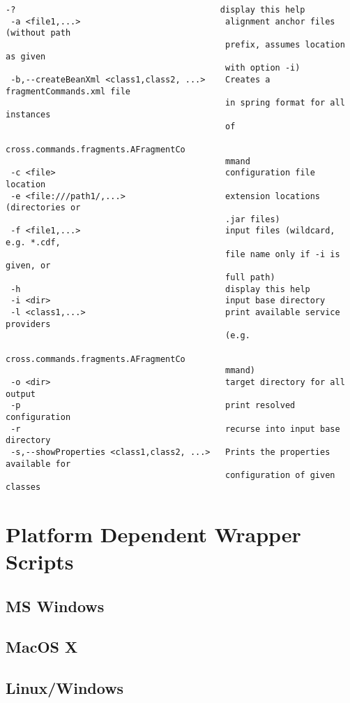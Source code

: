 \begin{verbatim}
-?                                         display this help
 -a <file1,...>                             alignment anchor files (without path
                                            prefix, assumes location as given
                                            with option -i)
 -b,--createBeanXml <class1,class2, ...>    Creates a fragmentCommands.xml file
                                            in spring format for all instances
                                            of
                                            cross.commands.fragments.AFragmentCo
                                            mmand
 -c <file>                                  configuration file location
 -e <file:///path1/,...>                    extension locations (directories or
                                            .jar files)
 -f <file1,...>                             input files (wildcard, e.g. *.cdf,
                                            file name only if -i is given, or
                                            full path)
 -h                                         display this help
 -i <dir>                                   input base directory
 -l <class1,...>                            print available service providers
                                            (e.g.
                                            cross.commands.fragments.AFragmentCo
                                            mmand)
 -o <dir>                                   target directory for all output
 -p                                         print resolved configuration
 -r                                         recurse into input base directory
 -s,--showProperties <class1,class2, ...>   Prints the properties available for
                                            configuration of given classes
\end{verbatim}

\section{Platform Dependent Wrapper Scripts}

\subsection{MS Windows}
\subsection{MacOS X}
\subsection{Linux/Windows}